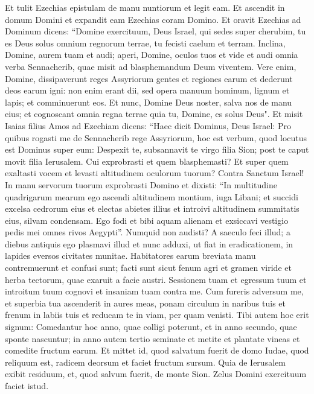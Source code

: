 \begin{biblechapter}
\verse Et tulit Ezechias epistulam de manu nuntiorum et legit eam. Et ascendit in domum Domini et expandit eam Ezechias coram Domino. 
\verse Et oravit Ezechias ad Dominum dicens: 
\verse “Domine exercituum, Deus Israel, qui sedes super cherubim, tu es Deus solus omnium regnorum terrae, tu fecisti caelum et terram. 
\verse Inclina, Domine, aurem tuam et audi; aperi, Domine, oculos tuos et vide et audi omnia verba Sennacherib, quae misit ad blasphemandum Deum viventem. 
\verse Vere enim, Domine, dissipaverunt reges Assyriorum gentes et regiones earum 
\verse et dederunt deos earum igni: non enim erant dii, sed opera manuum hominum, lignum et lapis; et comminuerunt eos. 
\verse Et nunc, Domine Deus noster, salva nos de manu eius; et cognoscant omnia regna terrae quia tu, Domine, es solus Deus". 
\verse Et misit Isaias filius Amos ad Ezechiam dicens: “Haec dicit Dominus, Deus Israel: Pro quibus rogasti me de Sennacherib rege Assyriorum, 
\verse hoc est verbum, quod locutus est Dominus super eum: Despexit te, subsannavit te virgo filia Sion; post te caput movit filia Ierusalem. 
\verse Cui exprobrasti et quem blasphemasti? Et super quem exaltasti vocem et levasti altitudinem oculorum tuorum? Contra Sanctum Israel! 
\verse In manu servorum tuorum exprobrasti Domino et dixisti: “In multitudine quadrigarum mearum ego ascendi altitudinem montium, iuga Libani; et succidi excelsa cedrorum eius et electas abietes illius et introivi altitudinem summitatis eius, silvam condensam. 
\verse Ego fodi et bibi aquam alienam et exsiccavi vestigio pedis mei omnes rivos Aegypti”. 
\verse Numquid non audisti? A saeculo feci illud; a diebus antiquis ego plasmavi illud et nunc adduxi, ut fiat in eradicationem, in lapides eversos civitates munitae. 
\verse Habitatores earum breviata manu contremuerunt et confusi sunt; facti sunt sicut fenum agri et gramen viride et herba tectorum, quae exaruit a facie austri. 
\verse Sessionem tuam et egressum tuum et introitum tuum cognovi et insaniam tuam contra me. 
\verse Cum fureris adversum me, et superbia tua ascenderit in aures meas, ponam circulum in naribus tuis et frenum in labiis tuis et reducam te in viam, per quam venisti. 
\verse Tibi autem hoc erit signum: Comedantur hoc anno, quae colligi poterunt, et in anno secundo, quae sponte nascuntur; in anno autem tertio seminate et metite et plantate vineas et comedite fructum earum. 
\verse Et mittet id, quod salvatum fuerit de domo Iudae, quod reliquum est, radicem deorsum et faciet fructum sursum. 
\verse Quia de Ierusalem exibit residuum, et, quod salvum fuerit, de monte Sion. Zelus Domini exercituum faciet istud. 

\end{biblechapter}

